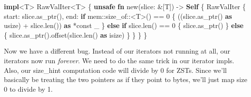 \documentclass[a4paper,]{book}
\newenvironment{Shaded}{\begin{snugshade}}{\end{snugshade}}
\newcommand{\KeywordTok}[1]{\textcolor[rgb]{0.13,0.29,0.53}{\textbf{{#1}}}}
\newcommand{\DecValTok}[1]{\textcolor[rgb]{0.00,0.00,0.81}{{#1}}}
\newcommand{\NormalTok}[1]{{#1}}
\begin{document}
\begin{Shaded}
\begin{Highlighting}[]
\KeywordTok{impl}\NormalTok{<T> RawValIter<T> \{}
    \KeywordTok{unsafe} \KeywordTok{fn} \NormalTok{new(slice: &[T]) -> }\KeywordTok{Self} \NormalTok{\{}
        \NormalTok{RawValIter \{}
            \NormalTok{start: slice.as_ptr(),}
            \NormalTok{end: }\KeywordTok{if} \NormalTok{mem::size_of::<T>() == }\DecValTok{0} \NormalTok{\{}
                \NormalTok{((slice.as_ptr() }\KeywordTok{as} \NormalTok{usize) + slice.len()) }\KeywordTok{as} \NormalTok{*const _}
            \NormalTok{\} }\KeywordTok{else} \KeywordTok{if} \NormalTok{slice.len() == }\DecValTok{0} \NormalTok{\{}
                \NormalTok{slice.as_ptr()}
            \NormalTok{\} }\KeywordTok{else} \NormalTok{\{}
                \NormalTok{slice.as_ptr().offset(slice.len() }\KeywordTok{as} \NormalTok{isize)}
            \NormalTok{\}}
        \NormalTok{\}}
    \NormalTok{\}}
\NormalTok{\}}
\end{Highlighting}
\end{Shaded}

Now we have a different bug. Instead of our iterators not running at
all, our iterators now run \emph{forever}. We need to do the same trick
in our iterator impls. Also, our size\_hint computation code will divide
by 0 for ZSTs. Since we'll basically be treating the two pointers as if
they point to bytes, we'll just map size 0 to divide by 1.
\end{document}
